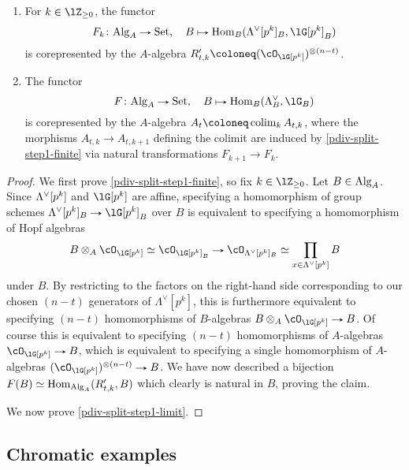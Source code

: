 \begin{proposition}
  \label{pdiv-split-step1}
  \begin{enumerate}[leftmargin=*]
  \item \label{pdiv-split-step1-finite} For $k \in \lZ_{\ge 0}$, the
    functor
    \[
    F_k \c \Alg_A \to \Set, \quad
    B \mapsto \Hom_B(\Lambda^\dual[p^k]_B, \lG[p^k]_B)
    \]
    is corepresented by the $A$-algebra
    $R'_{t,k} \ce (\cO_{\lG[p^k]})^{\otimes(n-t)}$.
  \item \label{pdiv-split-step1-limit} The functor
    \[
    F \c \Alg_A \to \Set, \quad
    B \mapsto \Hom_B(\Lambda^\dual_B, \lG_B)
    \]
    is corepresented by the $A$-algebra $A_t \ce \colim_k A_{t,k}$,
    where the morphisms $A_{t,k} \to A_{t,k+1}$ defining the colimit
    are induced by \cref{pdiv-split-step1-finite} via natural
    transformations $F_{k+1} \to F_k$.
  \end{enumerate}
\end{proposition}

\begin{proof}
  We first prove \cref{pdiv-split-step1-finite}, so fix
  $k \in \lZ_{\ge 0}$. Let $B \in \mathrm{Alg}_A$. Since $\Lambda^\vee[p^k]$
  and $\lG[p^k]$ are affine, specifying a homomorphism of group
  schemes $\Lambda^\dual[p^k]_B \to \lG[p^k]_B$ over $B$ is equivalent
  to specifying a homomorphism of Hopf algebras
  \[
  B \otimes_A \cO_{\lG[p^k]} \iso
  \cO_{\lG[p^k]_B} \to
  \cO_{\Lambda^\dual[p^k]_B} \iso
  \prod_{x \in \Lambda^\vee[p^k]} B
  \]
  under $B$. By restricting to the factors on the right-hand side
  corresponding to our chosen $(n-t)$ generators of
  $\Lambda^\vee[p^k]$, this is furthermore equivalent to specifying
  $(n-t)$ homomorphisms of $B$-algebras
  $B \otimes_A \cO_{\lG[p^k]} \to B$. Of course this is equivalent to
  specifying $(n-t)$ homomorphisms of $A$-algebras
  $\cO_{\lG[p^k]} \to B$, which is equivalent to specifying a single
  homomorphism of $A$-algebras
  $(\cO_{\lG[p^k]})^{\otimes(n-t)} \to B$. We have now described a
  bijection $F(B) \simeq \operatorname{Hom}_{\mathrm{Alg}_A}(R'_{t,k},B)$ which clearly is
  natural in $B$, proving the claim.

  We now prove \cref{pdiv-split-step1-limit}.
\end{proof}


\subsection{Chromatic examples}
\label{pdiv-chromex}